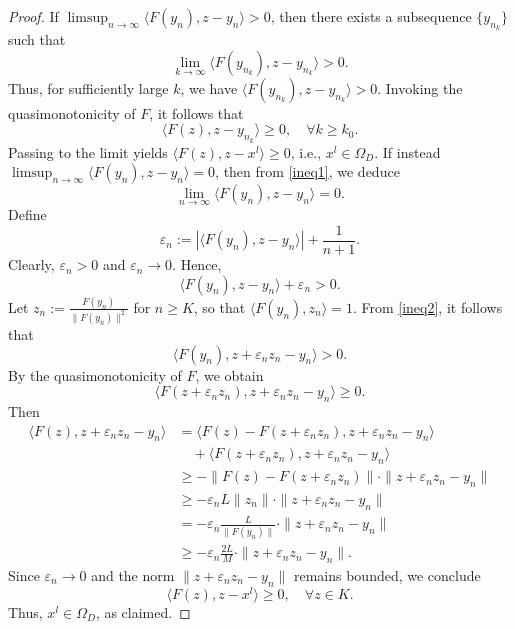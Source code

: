 \documentclass[hidelinks,11 pt]{article}
\numberwithin{equation}{section}
\theoremstyle{definition}  %
\numberwithin{equation}{section}
\numberwithin{theorem}{section}
\begin{document}
\begin{proof}
If \( \limsup_{n \to \infty} \langle F(y_n), z - y_n \rangle > 0 \), then there exists a subsequence \( \{y_{n_k}\} \) such that
\[
\lim_{k \to \infty} \langle F(y_{n_k}), z - y_{n_k} \rangle > 0.
\]
Thus, for sufficiently large \( k \), we have \( \langle F(y_{n_k}), z - y_{n_k} \rangle > 0 \). Invoking the quasimonotonicity of \( F \), it follows that
\[
\langle F(z), z - y_{n_k} \rangle \geq 0, \quad \forall k \geq k_0.
\]
Passing to the limit yields \( \langle F(z), z - x^l \rangle \geq 0 \), i.e., \( x^l \in \Omega_D \).
\vskip 2mm
If instead \( \limsup_{n \to \infty} \langle F(y_n), z - y_n \rangle = 0 \), then from \eqref{ineq1}, we deduce
\[
\lim_{n \to \infty} \langle F(y_n), z - y_n \rangle = 0.
\]
Define
\[
\varepsilon_n := |\langle F(y_n), z - y_n \rangle| + \frac{1}{n+1}.
\]
Clearly, \( \varepsilon_n > 0 \) and \( \varepsilon_n \to 0 \). Hence,
\begin{equation} \label{ineq2}
    \langle F(y_n), z - y_n \rangle + \varepsilon_n > 0.
\end{equation}
Let \( z_n := \frac{F(y_n)}{\|F(y_n)\|^2} \) for \( n \geq K \), so that \( \langle F(y_n), z_n \rangle = 1 \). From \eqref{ineq2}, it follows that
\[
\langle F(y_n), z + \varepsilon_n z_n - y_n \rangle > 0.
\]
By the quasimonotonicity of \( F \), we obtain
\[
\langle F(z + \varepsilon_n z_n), z + \varepsilon_n z_n - y_n \rangle \geq 0.
\]
Then
\begin{align*}
\langle F(z), z + \varepsilon_n z_n - y_n \rangle 
&= \langle F(z) - F(z + \varepsilon_n z_n), z + \varepsilon_n z_n - y_n \rangle \\
&\quad + \langle F(z + \varepsilon_n z_n), z + \varepsilon_n z_n - y_n \rangle \\
&\geq -\|F(z) - F(z + \varepsilon_n z_n)\| \cdot \|z + \varepsilon_n z_n - y_n\| \\
&\geq -\varepsilon_n L \|z_n\| \cdot \|z + \varepsilon_n z_n - y_n\| \\
&= -\varepsilon_n \frac{L}{\|F(y_n)\|} \cdot \|z + \varepsilon_n z_n - y_n\| \\
&\geq -\varepsilon_n \frac{2L}{M} \cdot \|z + \varepsilon_n z_n - y_n\|.
\end{align*}
Since \( \varepsilon_n \to 0 \) and the norm \( \|z + \varepsilon_n z_n - y_n\| \) remains bounded, we conclude
\[
\langle F(z), z - x^l \rangle \geq 0, \quad \forall z \in K.
\]
Thus, \( x^l \in \Omega_D \), as claimed.
\end{proof}
\end{document}
